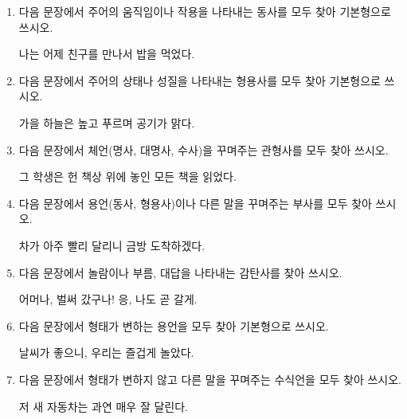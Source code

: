 \documentclass[fs9,seriesRus]{korfarm-base}
\begin{document}
\kfActivityBg \par{}\par\nopagebreak[4]\smallskip\nopagebreak[4]

\kfActivityBg {}
\par{}\par\nopagebreak[4]\smallskip\nopagebreak[4]
\begin{enumerate}[leftmargin=22pt, itemsep=6pt, topsep=4pt, label=\textbf{\arabic*.}]
\item 다음 문장에서 주어의 움직임이나 작용을 나타내는 동사를 모두 찾아 기본형으로 쓰시오.
\begin{kfEvidence}나는 어제 친구를 만나서 밥을 먹었다.\end{kfEvidence}
\item 다음 문장에서 주어의 상태나 성질을 나타내는 형용사를 모두 찾아 기본형으로 쓰시오.
\begin{kfEvidence}가을 하늘은 높고 푸르며 공기가 맑다.\end{kfEvidence}
\item 다음 문장에서 체언(명사, 대명사, 수사)을 꾸며주는 관형사를 모두 찾아 쓰시오.
\begin{kfEvidence}그 학생은 헌 책상 위에 놓인 모든 책을 읽었다.\end{kfEvidence}
\item 다음 문장에서 용언(동사, 형용사)이나 다른 말을 꾸며주는 부사를 모두 찾아 쓰시오.
\begin{kfEvidence}차가 아주 빨리 달리니 금방 도착하겠다.\end{kfEvidence}
\item 다음 문장에서 놀람이나 부름, 대답을 나타내는 감탄사를 찾아 쓰시오.
\begin{kfEvidence}어머나, 벌써 갔구나! 응, 나도 곧 갈게.\end{kfEvidence}
\item 다음 문장에서 형태가 변하는 용언을 모두 찾아 기본형으로 쓰시오.
\begin{kfEvidence}날씨가 좋으니, 우리는 즐겁게 놀았다.\end{kfEvidence}
\item 다음 문장에서 형태가 변하지 않고 다른 말을 꾸며주는 수식언을 모두 찾아 쓰시오.
\begin{kfEvidence}저 새 자동차는 과연 매우 잘 달린다.\end{kfEvidence}

\end{enumerate}
\end{document}
